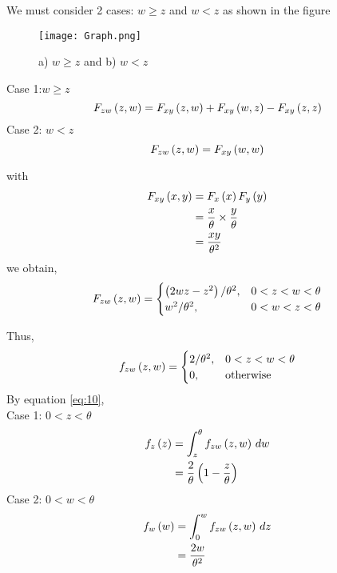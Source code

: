 \documentclass{beamer}
\begin{document}
\begin{frame}{}
We must consider 2 cases: $w \geq z$ and $w < z$ as shown in the figure
\begin{figure}[!ht]
\texttt{[image: Graph.png]}
\caption{a) $w\geq z$ and b) $w < z$}
\label{Fig 1}
\end{figure}
\end{frame}

\begin{frame}{}
   Case 1:$w \geq z$
\begin{equation}
    F_{zw}\left(z,w\right) = F_{xy}\left(z,w\right) + F_{xy}\left(w,z\right) - F_{xy}\left(z,z\right)
\end{equation}
Case 2: $w < z$
\begin{equation}
    F_{zw}\left(z,w\right) = F_{xy}\left(w,w\right)
\end{equation}
\end{frame}

\begin{frame}{}
    with
\begin{align}
   F_{xy}\left(x,y\right) &= F_{x}\left(x\right) F_{y}\left(y\right) \\ 
                    &= \frac{x}{\theta}\times \frac{y}{\theta} \\
                    &= \frac{xy}{\theta^2}
\end{align}
we obtain,
\begin{align}
 F_{zw}\left(z,w\right) = 
\begin{cases}
\left(2wz - z^2\right)/\theta^2, & 0 < z < w < \theta \\
w^2/\theta^2, & 0 < w < z < \theta 
\end{cases}
\end{align}
\end{frame}

\begin{frame}{}
    Thus, 
\begin{align}  \label{eq:10}
f_{zw}\left(z,w\right) = 
\begin{cases}
2/\theta^2, & 0 < z < w < \theta \\
0, & \text{otherwise}
\end{cases}
\end{align}
By equation \eqref{eq:10}, \\
Case 1: $0 < z < \theta$
\begin{align}
    f_{z}\left(z\right) &= \int_{z}^{\theta} f_{zw}\left(z,w\right) \,dw  \\
                  &= \frac{2}{\theta}\left(1-\frac{z}{\theta}\right)  
\end{align}
Case 2: $0 < w < \theta$
\begin{align}
    f_{w}\left(w\right) &= \int_{0}^{w} f_{zw}\left(z,w\right) \,dz  \\
                  &= \frac{2w}{\theta^2}
\end{align}

\end{frame}
\end{document}
